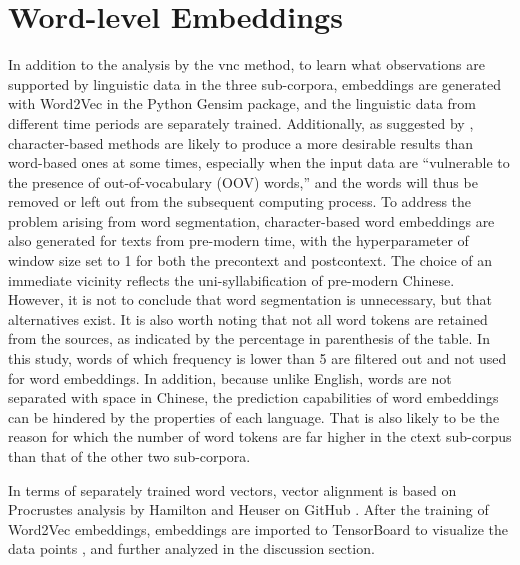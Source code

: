 \section{Word-level Embeddings}
In addition to the analysis by the \gls{vnc} method, to learn what observations are supported by linguistic data in the three sub-corpora, embeddings are generated with Word2Vec in the Python Gensim package, and the linguistic data from different time periods are separately trained. Additionally, as suggested by \textcite{li2019word}, character-based methods are likely to produce a more desirable results than word-based ones at some times, especially when the input data are ``vulnerable to the presence of out-of-vocabulary (OOV) words,'' and the words will thus be removed or left out from the subsequent computing process. To address the problem arising from word segmentation, character-based word embeddings are also generated for texts from pre-modern time, with the hyperparameter of window size set to 1 for both the precontext and postcontext. The choice of an immediate vicinity reflects the uni-syllabification of pre-modern Chinese. However, it is not to conclude that word segmentation is unnecessary, but that alternatives exist.  It is also worth noting that not all word tokens are retained from the sources, as indicated by the percentage in parenthesis of the table. In this study, words of which frequency is lower than 5 are filtered out and not used for word embeddings. In addition, because unlike English, words are not separated with space in Chinese, the prediction capabilities of word embeddings can be hindered by the properties of each language. That is also likely to be the reason for which the number of word tokens are far higher in the \gls{ctext} sub-corpus than that of the other two sub-corpora.

In terms of separately trained word vectors, vector alignment is based on Procrustes analysis by Hamilton and Heuser on GitHub \parencite{hamilton2016law}. After the training of Word2Vec embeddings, embeddings are imported to TensorBoard to visualize the data points \parencite{smilkov2016projector}, and further analyzed in the discussion section.

